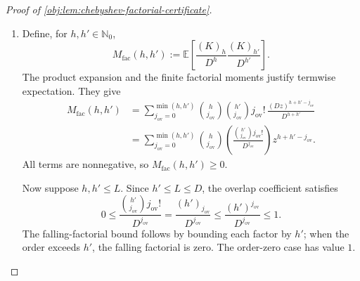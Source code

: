\documentclass[11pt]{article}
\begin{document}
\begin{proof}[Proof of \cref{obj:lem:chebyshev-factorial-certificate}]
\begin{enumerate}
Let \(h,h'\in\mathbb N_0\). First suppose \(h\le h'\). The binomial addition identity for falling-factorial polynomials, applied to \(x=(x-h)+h\), gives
\[
F_{\mathrm{fac},h'}(x)
 =\sum_{j_{\mathrm{ov}}=0}^{h'}
   \binom{h'}{j_{\mathrm{ov}}}
   F_{\mathrm{fac},j_{\mathrm{ov}}}(h)
   F_{\mathrm{fac},h'-j_{\mathrm{ov}}}(x-h).
\]
The product definition supplies
\[
F_{\mathrm{fac},h}(x)
F_{\mathrm{fac},h'-j_{\mathrm{ov}}}(x-h)
 =F_{\mathrm{fac},h+h'-j_{\mathrm{ov}}}(x).
\]
Moreover,
\[
F_{\mathrm{fac},j_{\mathrm{ov}}}(h)=0
 \quad(j_{\mathrm{ov}}>h),
\qquad
F_{\mathrm{fac},j_{\mathrm{ov}}}(h)
 =j_{\mathrm{ov}}!\binom{h}{j_{\mathrm{ov}}}
 \quad(0\le j_{\mathrm{ov}}\le h).
\]
Multiplying the addition identity by \(F_{\mathrm{fac},h}(x)\) and removing its zero terms thus gives
\[
F_{\mathrm{fac},h}(x)F_{\mathrm{fac},h'}(x)
 =\sum_{j_{\mathrm{ov}}=0}^{h}
   \binom{h}{j_{\mathrm{ov}}}
   \binom{h'}{j_{\mathrm{ov}}}
   j_{\mathrm{ov}}!\,
   F_{\mathrm{fac},h+h'-j_{\mathrm{ov}}}(x).
\]
If \(h'>h\) fails, exchange the two orders; the product and the coefficients are symmetric. Evaluating the resulting identity at any integer \(k\ge0\) yields
\[
(k)_h(k)_{h'}
 =\sum_{j_{\mathrm{ov}}=0}^{\min(h,h')}
   \binom{h}{j_{\mathrm{ov}}}
   \binom{h'}{j_{\mathrm{ov}}}
   j_{\mathrm{ov}}!\,(k)_{h+h'-j_{\mathrm{ov}}}.
\]

\item Define, for \(h,h'\in\mathbb N_0\),
\[
M_{\mathrm{fac}}(h,h')
 :=\mathbb E\!\left[
       \frac{(K)_h}{D^h}\frac{(K)_{h'}}{D^{h'}}
     \right].
\]
The product expansion and the finite factorial moments justify termwise expectation. They give
\[
\begin{aligned}
M_{\mathrm{fac}}(h,h')
 &=\sum_{j_{\mathrm{ov}}=0}^{\min(h,h')}
   \binom{h}{j_{\mathrm{ov}}}
   \binom{h'}{j_{\mathrm{ov}}}
   j_{\mathrm{ov}}!\,
   \frac{(Dz)^{h+h'-j_{\mathrm{ov}}}}{D^{h+h'}}\\
 &=\sum_{j_{\mathrm{ov}}=0}^{\min(h,h')}
   \binom{h}{j_{\mathrm{ov}}}
   \left(
     \frac{\binom{h'}{j_{\mathrm{ov}}}j_{\mathrm{ov}}!}
          {D^{j_{\mathrm{ov}}}}
   \right)
   z^{h+h'-j_{\mathrm{ov}}}.
\end{aligned}
\]
All terms are nonnegative, so \(M_{\mathrm{fac}}(h,h')\ge0\).

Now suppose \(h,h'\le L\). Since \(h'\le L\le D\), the overlap coefficient satisfies
\[
0\le
\frac{\binom{h'}{j_{\mathrm{ov}}}j_{\mathrm{ov}}!}
     {D^{j_{\mathrm{ov}}}}
 =\frac{(h')_{j_{\mathrm{ov}}}}{D^{j_{\mathrm{ov}}}}
 \le\frac{(h')^{j_{\mathrm{ov}}}}{D^{j_{\mathrm{ov}}}}
 \le1.
\]
The falling-factorial bound follows by bounding each factor by \(h'\); when the order exceeds \(h'\), the falling factorial is zero. The order-zero case has value \(1\).


\end{enumerate}
\end{proof}
\end{document}
